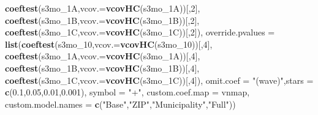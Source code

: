 \documentclass[
]{article}
\newenvironment{Shaded}{\begin{snugshade}}{\end{snugshade}}
\newcommand{\DataTypeTok}[1]{\textcolor[rgb]{0.13,0.29,0.53}{#1}}
\newcommand{\DecValTok}[1]{\textcolor[rgb]{0.00,0.00,0.81}{#1}}
\newcommand{\FloatTok}[1]{\textcolor[rgb]{0.00,0.00,0.81}{#1}}
\newcommand{\KeywordTok}[1]{\textcolor[rgb]{0.13,0.29,0.53}{\textbf{#1}}}
\newcommand{\NormalTok}[1]{#1}
\newcommand{\StringTok}[1]{\textcolor[rgb]{0.31,0.60,0.02}{#1}}
\begin{document}
\begin{Shaded}
\begin{Highlighting}[]
                             \KeywordTok{coeftest}\NormalTok{(s3mo_1A,}\DataTypeTok{vcov.=}\KeywordTok{vcovHC}\NormalTok{(s3mo_1A))[,}\DecValTok{2}\NormalTok{],}
                             \KeywordTok{coeftest}\NormalTok{(s3mo_1B,}\DataTypeTok{vcov.=}\KeywordTok{vcovHC}\NormalTok{(s3mo_1B))[,}\DecValTok{2}\NormalTok{],}
                             \KeywordTok{coeftest}\NormalTok{(s3mo_1C,}\DataTypeTok{vcov.=}\KeywordTok{vcovHC}\NormalTok{(s3mo_1C))[,}\DecValTok{2}\NormalTok{]),}
          \DataTypeTok{override.pvalues =} \KeywordTok{list}\NormalTok{(}\KeywordTok{coeftest}\NormalTok{(s3mo_}\DecValTok{10}\NormalTok{,}\DataTypeTok{vcov.=}\KeywordTok{vcovHC}\NormalTok{(s3mo_}\DecValTok{10}\NormalTok{))[,}\DecValTok{4}\NormalTok{],}
                                  \KeywordTok{coeftest}\NormalTok{(s3mo_1A,}\DataTypeTok{vcov.=}\KeywordTok{vcovHC}\NormalTok{(s3mo_1A))[,}\DecValTok{4}\NormalTok{],}
                                  \KeywordTok{coeftest}\NormalTok{(s3mo_1B,}\DataTypeTok{vcov.=}\KeywordTok{vcovHC}\NormalTok{(s3mo_1B))[,}\DecValTok{4}\NormalTok{],}
                                  \KeywordTok{coeftest}\NormalTok{(s3mo_1C,}\DataTypeTok{vcov.=}\KeywordTok{vcovHC}\NormalTok{(s3mo_1C))[,}\DecValTok{4}\NormalTok{]),}
          \DataTypeTok{omit.coef =} \StringTok{"(wave)"}\NormalTok{,}\DataTypeTok{stars =} \KeywordTok{c}\NormalTok{(}\FloatTok{0.1}\NormalTok{,}\FloatTok{0.05}\NormalTok{,}\FloatTok{0.01}\NormalTok{,}\FloatTok{0.001}\NormalTok{), }\DataTypeTok{symbol =} \StringTok{"+"}\NormalTok{,}
          \DataTypeTok{custom.coef.map =}\NormalTok{ vnmap, }
          \DataTypeTok{custom.model.names =} \KeywordTok{c}\NormalTok{(}\StringTok{"Base"}\NormalTok{,}\StringTok{"ZIP"}\NormalTok{,}\StringTok{"Municipality"}\NormalTok{,}\StringTok{"Full"}\NormalTok{))}
\end{Highlighting}
\end{Shaded}
\end{document}
